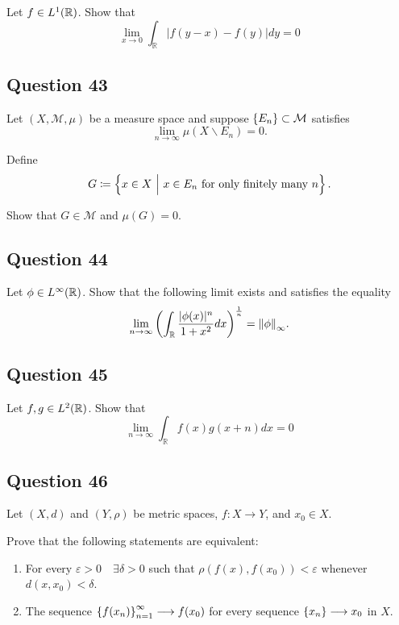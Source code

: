 \documentclass[12pt]{article}
\providecommand{\tightlist}{%
  \setlength{\itemsep}{0pt}\setlength{\parskip}{0pt}}
\begin{document}
Let \(f\in L^1({\mathbb{R}})\). Show that \[
\lim _{x \rightarrow 0} \int_{\mathbb{R}}|f(y-x)-f(y)| d y=0
\]

\hypertarget{question-43-1}{%
\subsection{Question 43}\label{question-43-1}}

Let \((X, \mathcal M, \mu)\) be a measure space and suppose
\(\left\{{E_n}\right\} \subset \mathcal M\) satisfies \[
\lim _{n \rightarrow \infty} \mu\left(X \backslash E_{n}\right)=0.
\]

Define \[
G \coloneqq \left\{{x\in X {~\mathrel{\Big|}~} x\in E_n \text{ for only finitely many  } n}\right\}.
\]

Show that \(G \in \mathcal M\) and \(\mu(G) = 0\).

\hypertarget{question-44-1}{%
\subsection{Question 44}\label{question-44-1}}

Let \(\phi\in L^\infty({\mathbb{R}})\). Show that the following limit exists and
satisfies the equality \[
\lim _{n \rightarrow \infty}\left(\int_{\mathbb{R}} \frac{|\phi(x)|^{n}}{1+x^{2}} d x\right)^{\frac{1}{n}} = {\left\lVert {\phi} \right\rVert}_\infty.
\]

\hypertarget{question-45-1}{%
\subsection{Question 45}\label{question-45-1}}

Let \(f, g \in L^2({\mathbb{R}})\). Show that \[
\lim _{n \rightarrow \infty} \int_{\mathbb{R}} f(x) g(x+n) d x=0
\]

\hypertarget{question-46-1}{%
\subsection{Question 46}\label{question-46-1}}

Let \((X, d)\) and \((Y, \rho)\) be metric spaces, \(f: X\to Y\), and
\(x_0 \in X\).

Prove that the following statements are equivalent:

\begin{enumerate}
\def\labelenumi{\arabic{enumi}.}
\tightlist
\item
  For every \(\varepsilon > 0 \quad \exists \delta > 0\) such that
  \(\rho( f(x), f(x_0) ) < \varepsilon\) whenever
  \(d(x, x_0) < \delta\).
\item
  The sequence \(\left\{{f(x_n)}\right\}_{n=1}^\infty \longrightarrow f(x_0)\) for every
  sequence \(\left\{{x_n}\right\} \longrightarrow x_0\) in \(X\).
\end{enumerate}
\end{document}
